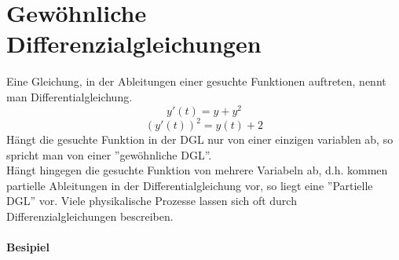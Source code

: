 \chapter{Gewöhnliche Differenzialgleichungen}
Eine Gleichung, in der Ableitungen einer gesuchte Funktionen auftreten, nennt man Differentialgleichung.
$$y'(t)=y+y^2$$
$$\left( y'(t)\right)^2=y(t)+2$$
Hängt die gesuchte Funktion in der DGL nur von einer einzigen variablen ab, so spricht man von einer ''gewöhnliche DGL''.\\

\noindent Hängt hingegen die gesuchte Funktion von mehrere Variabeln ab, d.h. kommen partielle Ableitungen in der Differentialgleichung vor, so liegt eine ''Partielle DGL'' vor. Viele physikalische Prozesse lassen sich oft durch Differenzialgleichungen bescreiben.
\subsubsection*{Besipiel}
